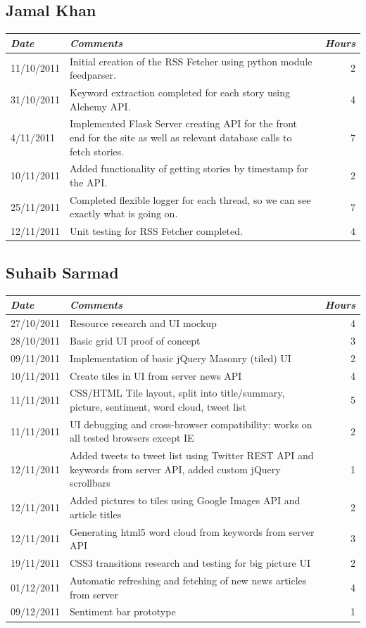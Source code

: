 \documentclass{report}
\begin{document}
		  \subsection{Jamal Khan}
		  \begin{tabular}{l | p{10cm} r}
	     \emph{\large Date} & \emph{\large Comments} & \emph{\large Hours}\\
	     \hline
		  11/10/2011 & Initial creation of the RSS Fetcher using python module feedparser. & 2\\
	    31/10/2011 & Keyword extraction completed for each story using Alchemy API. & 4\\
	    4/11/2011 & Implemented Flask Server creating API for the front end for the site as well as relevant database calls to fetch stories. & 7\\
	    10/11/2011 & Added functionality of getting stories by timestamp for the API. & 2\\
	    25/11/2011 & Completed flexible logger for each thread, so we can see exactly what is going on. & 7\\
	    12/11/2011 & Unit testing for RSS Fetcher completed. & 4
	  \end{tabular}

	  \subsection{Suhaib Sarmad}
	    \begin{tabular}{l | p{10cm} r}
	     \emph{\large Date} & \emph{\large Comments} & \emph{\large Hours}\\
	     \hline
	     27/10/2011 & Resource research and UI mockup & 4\\
	     28/10/2011 & Basic grid UI proof of concept & 3\\
	     09/11/2011 & Implementation of basic jQuery Masonry (tiled) UI & 2\\
	     10/11/2011 & Create tiles in UI from server news API & 4\\
	     11/11/2011 & CSS/HTML Tile layout, split into title/summary, picture, sentiment, word cloud, tweet list & 5\\
	     11/11/2011 & UI debugging and cross-browser compatibility: works on all tested browsers except IE & 2\\
	     12/11/2011 & Added tweets to tweet list using Twitter REST API and keywords from server API, added custom jQuery scrollbars & 1\\
	     12/11/2011 & Added pictures to tiles using Google Images API and article titles & 2\\
	     12/11/2011 & Generating html5 word cloud from keywords from server API & 3\\
	     19/11/2011 & CSS3 transitions research and testing for big picture UI & 2\\
	     01/12/2011 & Automatic refreshing and fetching of new news articles from server & 4\\
	     09/12/2011 & Sentiment bar prototype & 1
	    \end{tabular}
\end{document}
